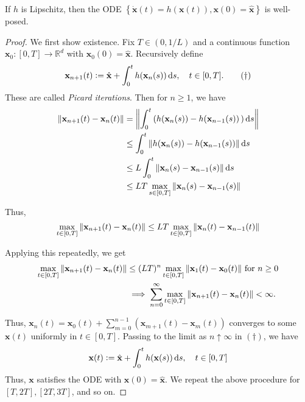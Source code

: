 \begin{thm}
    If $h$ is Lipschitz, then the ODE $\left\{ \dot{\mathbf{x}}(t) = h(\mathbf{x}(t)), \mathbf{x}(0) = \hat{\mathbf{x}} \right\}$ is well-posed. 
\end{thm}
\begin{proof}
    We first show existence. Fix $T \in (0, 1/L)$ and a continuous function $\mathbf{x}_0 \colon [0,T] \to \mathbb{R}^d$ with $\mathbf{x}_0(0) = \hat{\mathbf{x}}$. Recursively define
    \begin{equation*}
        \mathbf{x}_{n+1}(t) \vcentcolon= \hat{\mathbf{x}} + \int_0^t h(\mathbf{x}_n(s)) \, \mathrm{d} s, \quad t \in [0,T]. \tag{\(\dagger\)}
    \end{equation*}
    These are called \emph{Picard iterations}. Then for $n \geq 1$, we have
    \begin{align*}
        \norm{\mathbf{x}_{n+1}(t) - \mathbf{x}_n(t)} &= \norm{\int_0^t \left( h(\mathbf{x}_n(s)) - h(\mathbf{x}_{n-1}(s)) \, \right)\mathrm{d} s} \\
        &\leq \int_0^t \norm{h(\mathbf{x}_n(s)) - h(\mathbf{x}_{n-1}(s))} \, \mathrm{d} s \\ 
        &\leq L\int_0^t \norm{\mathbf{x}_n(s) - \mathbf{x}_{n-1}(s)} \, \mathrm{d} s \\
        &\leq LT \max_{s \in [0,T]} \norm{\mathbf{x}_n(s) - \mathbf{x}_{n-1}(s)}
    \end{align*}
    
    Thus, 
    \[
        \max_{t \in [0,T]} \norm{\mathbf{x}_{n+1}(t) - \mathbf{x}_n(t)} \leq LT \max_{t \in [0,T]} \norm{\mathbf{x}_n(t) - \mathbf{x}_{n-1}(t)}
    \]
    
    Applying this repeatedly, we get
    \begin{align*}
        \max_{t \in [0,T]} \norm{\mathbf{x}_{n+1}(t) - \mathbf{x}_n(t)} &\leq (LT)^n \max_{t \in [0,T]} \norm{\mathbf{x}_1(t) - \mathbf{x}_0(t)} \text{ for } n \geq 0 \\
        &\implies \sum_{n=0}^{\infty} \max_{t \in [0,T]}\norm{\mathbf{x}_{n+1}(t) - \mathbf{x}_n(t)} < \infty. 
    \end{align*}
    
    Thus, $\mathbf{x}_n(t) = \mathbf{x}_0(t) + \sum_{m=0}^{n-1} (\mathbf{x}_{m+1}(t) - \mathbf{x}_m(t))$ converges to some $\mathbf{x}(t)$ uniformly in $t \in [0,T]$. Passing to the limit as $n \uparrow \infty$ in $(\dagger)$, we have 
    \[
        \mathbf{x}(t) \vcentcolon= \hat{\mathbf{x}} + \int_0^t h(\mathbf{x}(s)) \, \mathrm{d} s, \quad t \in [0,T]
    \]
    Thus, $\mathbf{x}$ satisfies the ODE with $\mathbf{x}(0) = \hat{\mathbf{x}}$. We repeat the above procedure for $[T,2T], [2T,3T]$, and so on.
    

\end{proof}
